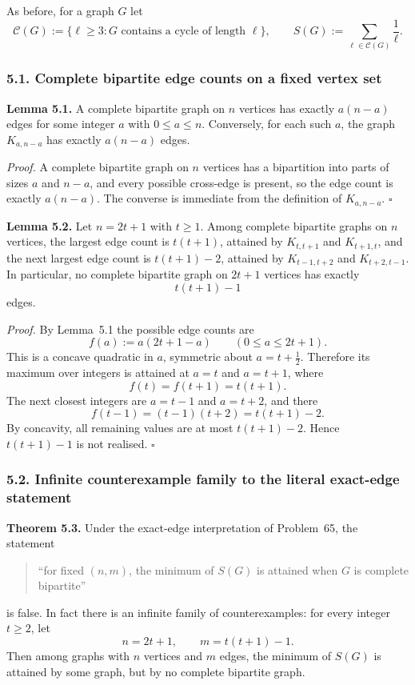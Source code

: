 As before, for a graph $G$ let
\[
\mathcal C(G):=\{\ell\ge 3:\text{$G$ contains a cycle of length $\ell$}\},
\qquad
S(G):=\sum_{\ell\in\mathcal C(G)}\frac1\ell.
\]

\subsubsection*{5.1. Complete bipartite edge counts on a fixed vertex set}

\textbf{Lemma 5.1.}
A complete bipartite graph on $n$ vertices has exactly $a(n-a)$ edges for some integer $a$ with $0\le a\le n$.
Conversely, for each such $a$, the graph $K_{a,n-a}$ has exactly $a(n-a)$ edges.

\medskip
\textit{Proof.}
A complete bipartite graph on $n$ vertices has a bipartition into parts of sizes $a$ and $n-a$, and every possible cross-edge is present, so the edge count is exactly $a(n-a)$.
The converse is immediate from the definition of $K_{a,n-a}$.
\hfill$\square$

\medskip
\textbf{Lemma 5.2.}
Let $n=2t+1$ with $t\ge 1$.
Among complete bipartite graphs on $n$ vertices, the largest edge count is $t(t+1)$, attained by $K_{t,t+1}$ and $K_{t+1,t}$, and the next largest edge count is $t(t+1)-2$, attained by $K_{t-1,t+2}$ and $K_{t+2,t-1}$.
In particular, no complete bipartite graph on $2t+1$ vertices has exactly
\[
t(t+1)-1
\]
edges.

\medskip
\textit{Proof.}
By Lemma~5.1 the possible edge counts are
\[
f(a):=a(2t+1-a)\qquad(0\le a\le 2t+1).
\]
This is a concave quadratic in $a$, symmetric about $a=t+\tfrac12$.
Therefore its maximum over integers is attained at $a=t$ and $a=t+1$, where
\[
f(t)=f(t+1)=t(t+1).
\]
The next closest integers are $a=t-1$ and $a=t+2$, and there
\[
f(t-1)=(t-1)(t+2)=t(t+1)-2.
\]
By concavity, all remaining values are at most $t(t+1)-2$.
Hence $t(t+1)-1$ is not realised.
\hfill$\square$

\subsubsection*{5.2. Infinite counterexample family to the literal exact-edge statement}

\textbf{Theorem 5.3.}
Under the exact-edge interpretation of Problem~65, the statement
\begin{quote}
``for fixed $(n,m)$, the minimum of $S(G)$ is attained when $G$ is complete bipartite''
\end{quote}
is false.
In fact there is an infinite family of counterexamples: for every integer $t\ge 2$, let
\[
n=2t+1,
\qquad
m=t(t+1)-1.
\]
Then among graphs with $n$ vertices and $m$ edges, the minimum of $S(G)$ is attained by some graph, but by no complete bipartite graph.

